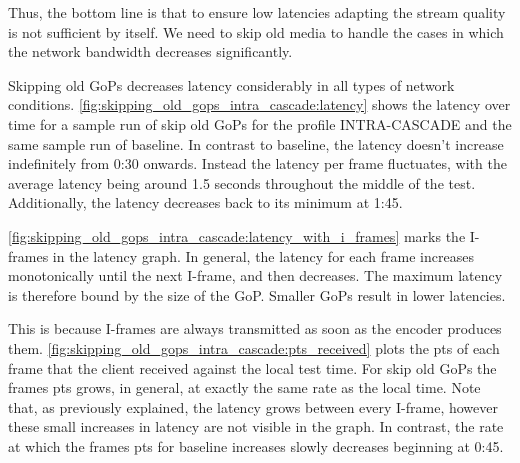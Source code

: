 
Thus, the bottom line is that to ensure low latencies adapting the stream quality is not sufficient by itself. %
We need to skip old media to handle the cases in which the network bandwidth decreases significantly.

Skipping old GoPs decreases latency considerably in all types of network conditions. \autoref{fig:skipping_old_gops_intra_cascade:latency} shows the latency over time for a sample run of skip old GoPs for the profile INTRA-CASCADE and the same sample run of baseline. In contrast to baseline, the latency doesn't increase indefinitely from 0:30 onwards. Instead the latency per frame fluctuates, with the average latency being around
1.5 seconds throughout the middle of the test. Additionally, the latency decreases back to its minimum at 1:45.

\autoref{fig:skipping_old_gops_intra_cascade:latency_with_i_frames} marks the I-frames in the latency graph. In general,
the latency for each frame increases monotonically until the next I-frame, and then decreases. The maximum latency is therefore bound by the size of the GoP. Smaller GoPs result in lower latencies.

This is because I-frames are always transmitted as soon as the encoder produces them. \autoref{fig:skipping_old_gops_intra_cascade:pts_received} plots the pts of each frame that the client received against the local test time. For skip old GoPs the frames pts grows, in general, at exactly the same rate as the local time. Note that, as previously explained, the latency grows between every I-frame, however these small increases in latency are not visible in the graph. %
In contrast, the rate at which the frames pts for baseline increases slowly decreases beginning at 0:45.

